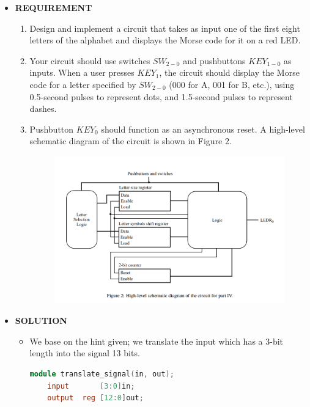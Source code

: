 \begin{itemize}
    \item[]\textbf{REQUIREMENT}
        \begin{enumerate}
            \item Design and implement a circuit that takes as input one of the first eight letters of the alphabet and displays the Morse code for it on a red LED.
            \item Your circuit should use switches $SW_{2-0}$ and pushbuttons $KEY_{1-0}$ as inputs. When a user presses $KEY_1$, the circuit should display the Morse code for a letter specified by $SW_{2-0}$ (000 for A, 001 for B, etc.), using 0.5-second pulses to represent dots, and 1.5-second pulses to represent dashes.
            \item Pushbutton $KEY_0$ should function as an asynchronous reset. A high-level schematic diagram of the circuit is shown in Figure 2.
                \begin{figure}[h]
                    \centering
                    \includegraphics[scale = 0.50]{source/picture/Lab5/Lab5_2.png}
                \end{figure}
        \end{enumerate}
\clearpage
    \item[]\textbf{SOLUTION}
        \begin{itemize}
            \item [] We base on the hint given; we translate the input which has a 3-bit length into the signal 13 bits.
                \begin{lstlisting}[language = verilog]
module translate_signal(in, out);
	input		[3:0]in;
	output	reg [12:0]out;
	

\end{lstlisting}
\end{itemize}
\end{itemize}
